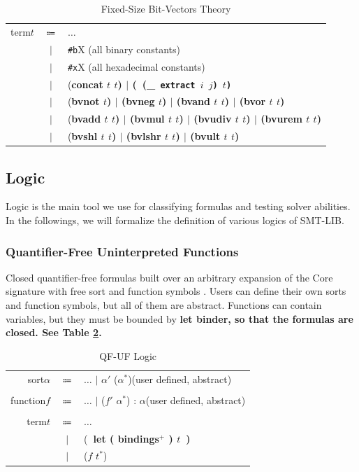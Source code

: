 \documentclass[10pt,letter]{article}
\theoremstyle{definition}
\begin{document}
\begin{table}[!h]
\begin{mdframed}
\begin{tabular}{r c l}
term\qquad $t$ & $\Coloneqq$ & $\ldots$ \\
& $\mid$ & {\tt \#b}X \rm\qquad (all binary constants)\\
& $\mid$ & {\tt \#x}X \rm\qquad (all hexadecimal constants)\\
& $\mid$ & (\bf concat \rm $t$ $t$) $\mid$ (\ (\_\tt\ {\bf extract} \rm $i$ $j$)\ $t$)\\
& $\mid$ & (\bf bvnot \rm $t$) $\mid$ (\bf bvneg \rm $t$) $\mid$ (\bf bvand \rm $t$ $t$) $\mid$ (\bf bvor \rm $t$ $t$)\\
& $\mid$ & (\bf bvadd \rm $t$ $t$) $\mid$ (\bf bvmul \rm $t$ $t$) $\mid$ (\bf bvudiv \rm $t$ $t$) $\mid$ (\bf bvurem \rm $t$ $t$)\\
& $\mid$ & (\bf bvshl \rm $t$ $t$) $\mid$ (\bf bvlshr \rm $t$ $t$) $\mid$ (\bf bvult \rm $t$ $t$) \\
\end{tabular}
\end{mdframed}
\caption{Fixed-Size Bit-Vectors Theory}
\label{t:bvtheory}
\end{table}


\subsection{Logic}

Logic is the main tool we use for classifying formulas and testing solver abilities. In the followings, we will formalize the definition of various logics of SMT-LIB.

\subsubsection{Quantifier-Free Uninterpreted Functions}
Closed quantifier-free formulas built over an arbitrary expansion of the Core signature with free sort and function symbols \cite{bs2010}. Users can define their own sorts and function symbols, but all of them are abstract. Functions can contain variables, but they must be bounded by \bf let \rm binder, so that the formulas are closed. See Table \ref{t:qfuflogic}.

\begin{table}[!h]
\begin{mdframed}
\centering
\begin{tabular}{r c l}
sort\qquad $\alpha$ & $\Coloneqq$ & $\ldots$ $\mid$ $\alpha'$ ($\alpha^*$)\rm\qquad(user defined, abstract)\\
\\
function\qquad $f$ & $\Coloneqq$ & $\ldots$ $\mid$ \rm ($f'$ $\alpha^*$) : $\alpha$\qquad(user defined, abstract)\\
\\
term\qquad $t$ & $\Coloneqq$ & $\ldots$ \\
& $\mid$ & (\bf\ let \rm ( bindings$^+$ ) $t$\ )\\
& $\mid$ & ($f$ $t^*$)
\end{tabular}
\end{mdframed}
\caption{QF-UF Logic}
\label{t:qfuflogic}
\end{table}
\end{document}
